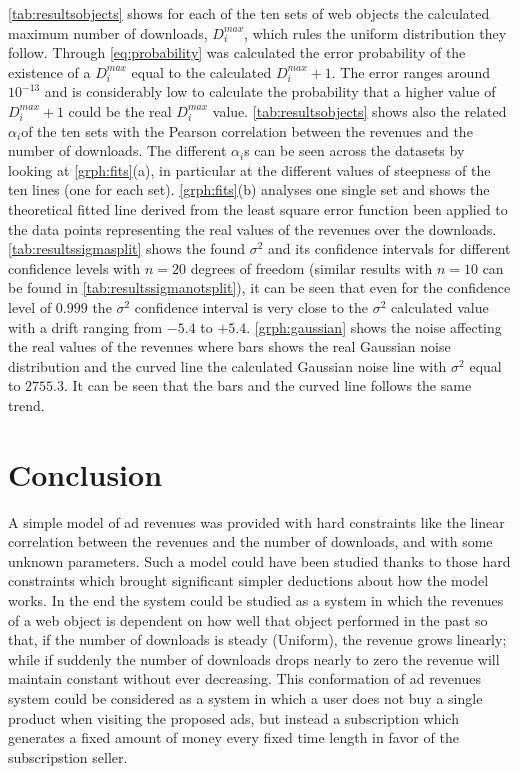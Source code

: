 \documentclass[conference]{IEEEtran}
\begin{document}
\cref{tab:resultsobjects} shows for each of the ten sets of web objects the calculated maximum number of downloads, \(D_i^{max}\), which rules the uniform distribution they follow. Through \cref{eq:probability} was calculated the error probability of the existence of a \(D_i^{max}\) equal to the calculated \(D_i^{max}+1\). The error ranges around \(10^{-13}\) and is considerably low to calculate the probability that a higher value of \(D_i^{max}+1\) could be the real \(D_i^{max}\) value.
\cref{tab:resultsobjects} shows also the related \(\alpha_i\)of the ten sets with the Pearson correlation between the revenues and the number of downloads. The different \(\alpha_i\)s can be seen across the datasets by looking at \cref{grph:fits}(a), in particular at the different values of steepness of the ten lines (one for each set).
\cref{grph:fits}(b) analyses one single set and shows the theoretical fitted line derived from the least square error function been applied to the data points representing the real values of the revenues over the downloads.
\cref{tab:resultssigmasplit} shows the found \(\sigma^2\) and its confidence intervals for different confidence levels with \(n=20\) degrees of freedom (similar results with \(n=10\) can be found in \cref{tab:resultssigmanotsplit}), it can be seen that even for the confidence level of \(0.999\) the \(\sigma^2\) confidence interval is very close to the \(\sigma^2\) calculated value with a drift ranging from \(-5.4\) to \(+5.4\). \cref{grph:gaussian} shows the noise affecting the real values of the revenues where bars shows the real Gaussian noise distribution and the curved line the calculated Gaussian noise line with \(\sigma^2\) equal to \(2755.3\). It can be seen that the bars and the curved line follows the same trend.

\section{Conclusion}\label{sec:conclusion}

A simple model of ad revenues was provided with hard constraints like the linear correlation between the revenues and the number of downloads, and with some unknown parameters. Such a model could have been studied thanks to those hard constraints which brought significant simpler deductions about how the model works. In the end the system could be studied as a system in which the revenues of a web object is dependent on how well that object performed in the past so that, if the number of downloads is steady (Uniform), the revenue grows linearly; while if suddenly the number of downloads drops nearly to zero the revenue will maintain constant without ever decreasing. This conformation of ad revenues system could be considered as a system in which a user does not buy a single product when visiting the proposed ads, but instead a subscription which generates a fixed amount of money every fixed time length in favor of the subscripstion seller.
\end{document}

